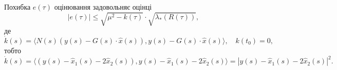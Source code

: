 \begin{solution}
	Похибка $e(\tau)$ оцінювання задовольняє оцінці \[ |e(\tau)| \le \sqrt{\mu^2-k(\tau)} \cdot \sqrt{\lambda_* (R(\tau))},\] де \[ \dot k (s) = \langle N(s) (y(s) - G(s) \cdot \hat x(s)), y(s) - G(s) \cdot \hat x(s)\rangle, \quad k(t_0) = 0, \] тобто \[ \dot k (s) = \langle (y(s) - \hat x_1(s) - 2 \hat x_2(s)), y(s) - \hat x_1(s) - 2 \hat x_2(s)\rangle = |y(s) - \hat x_1(s) - 2 \hat x_2(s)|^2. \]

\end{solution}
